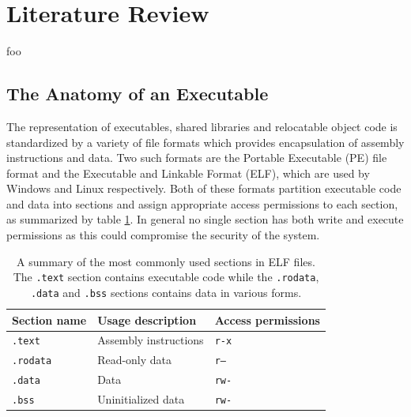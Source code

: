 \documentclass[12pt, a4paper]{article}
\begin{document}

\section{Literature Review}

foo


\subsection{The Anatomy of an Executable}
\label{executable_anatomy}

The representation of executables, shared libraries and relocatable object code is standardized by a variety of file formats which provides encapsulation of assembly instructions and data. Two such formats are the Portable Executable (PE) file format and the Executable and Linkable Format (ELF), which are used by Windows and Linux respectively. Both of these formats partition executable code and data into sections and assign appropriate access permissions to each section, as summarized by table \ref{elf_sections}. In general no single section has both write and execute permissions as this could compromise the security of the system.

\begin{table}[htbp]
	\begin{center}
		\begin{tabular}{|l|l|l|}
			\hline
			Section name & Usage description & Access permissions \\
			\hline
			\texttt{.text} & Assembly instructions & \texttt{r-x} \\
			\texttt{.rodata} & Read-only data & \texttt{r--} \\
			\texttt{.data} & Data & \texttt{rw-} \\
			\texttt{.bss} & Uninitialized data & \texttt{rw-} \\
			\hline
		\end{tabular}
	\end{center}
	\caption{A summary of the most commonly used sections in ELF files. The \texttt{.text} section contains executable code while the \texttt{.rodata}, \texttt{.data} and \texttt{.bss} sections contains data in various forms.}
	\label{elf_sections}
\end{table}
\end{document}
